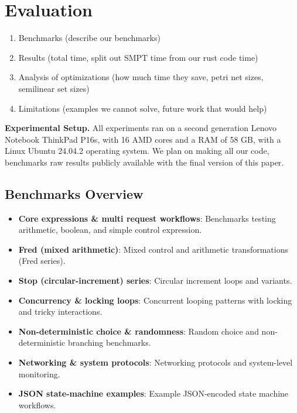 \section{Evaluation}
\label{sec:evaluation}

\begin{enumerate}
    \item Benchmarks (describe our benchmarks)
    \item Results (total time, split out SMPT time from our rust code time)
    \item Analysis of optimizations (how much time they save, petri net sizes, semilinear set sizes)
    \item Limitations (examples we cannot solve, future work that would help)
\end{enumerate}


\noindent
\textbf{Experimental Setup.}
All experiments ran on a second generation Lenovo Notebook ThinkPad P16s, with 16 AMD cores and a RAM of 58 GB, with a Linux Ubuntu 24.04.2 operating system.
%
We plan on making all our code, benchmarks raw results publicly available with the final version of this paper.
 


\subsection{Benchmarks Overview}
\label{subsec:benchmarks}

\begin{itemize}
	\item \textbf{Core expressions \& multi request workflows}: Benchmarks testing arithmetic, boolean, and simple control expression.
	\item \textbf{Fred (mixed arithmetic)}: Mixed control and arithmetic transformations (Fred series).
	\item \textbf{Stop (circular-increment) series}: Circular increment loops and variants.
	\item \textbf{Concurrency \& locking loops}: Concurrent looping patterns with locking and tricky interactions.
	\item \textbf{Non-deterministic choice \& randomness}: Random choice and non-deterministic branching benchmarks.
	\item \textbf{Networking \& system protocols}: Networking protocols and system-level monitoring.
	\item \textbf{JSON state-machine examples}: Example JSON-encoded state machine workflows.
\end{itemize}


